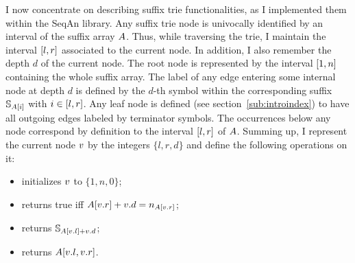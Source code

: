 I now concentrate on describing suffix trie functionalities, as I implemented them within the SeqAn library.
Any suffix trie node is univocally identified by an interval of the suffix array $A$.
Thus, while traversing the trie, I maintain the interval $[l,r]$ associated to the current node.
In addition, I also remember the depth $d$ of the current node.
The root node is represented by the interval $[1,n]$ containing the whole suffix array.
The label of any edge entering some internal node at depth $d$ is defined by the $d$-th symbol within the corresponding suffix $\mathbb{S}_{A[i]}$ with $i \in [l,r]$.
Any leaf node is defined (see section~\ref{sub:introindex}) to have all outgoing edges labeled by terminator symbols.
The occurrences below any node correspond by definition to the interval $[l,r]$ of $A$.
Summing up, I represent the current node $v$ by the integers $\{ l, r ,d \}$ and define the following operations on it:
\begin{itemize}
\item {} initializes $v$ to $\{ 1, n, 0\}$;
\item {} returns true iff $A[v.r] + v.d = n_{A[v.r]}$;
\item {} returns $\mathbb{S}_{A[v.l] + v.d}$;
\item {} returns $A[v.l,v.r]$.
\end{itemize}

